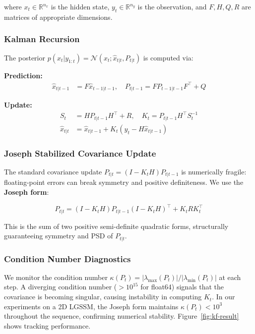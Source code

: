 \documentclass[12pt,a4paper]{article}
\theoremstyle{definition}
\theoremstyle{remark}
\newcommand{\R}{\mathbb{R}}
\newcommand{\N}{\mathcal{N}}
\begin{document}
\noindent where $x_t \in \R^{n_x}$ is the hidden state, $y_t \in \R^{n_y}$ is the observation, and $F, H, Q, R$ are matrices of appropriate dimensions.

\subsubsection{Kalman Recursion}

The posterior $p(x_t | y_{1:t}) = \N(x_t; \hat{x}_{t|t}, P_{t|t})$ is computed via:

\textbf{Prediction:}
\begin{align}
	\hat{x}_{t|t-1} &= F \hat{x}_{t-1|t-1}, \quad
	P_{t|t-1} = F P_{t-1|t-1} F^\top + Q
\end{align}

\textbf{Update:}
\begin{align}
	S_t &= H P_{t|t-1} H^\top + R, \quad
	K_t = P_{t|t-1} H^\top S_t^{-1} \\
	\hat{x}_{t|t} &= \hat{x}_{t|t-1} + K_t (y_t - H \hat{x}_{t|t-1})
\end{align}

\subsubsection{Joseph Stabilized Covariance Update}

The standard covariance update $P_{t|t} = (I - K_t H) P_{t|t-1}$ is numerically fragile: floating-point errors can break symmetry and positive definiteness. We use the \textbf{Joseph form}:

\begin{tcolorbox}[colback=blue!5!white,colframe=blue!75!black,title=Joseph Stabilized Update]
	\begin{equation}
		P_{t|t} = (I - K_t H) P_{t|t-1} (I - K_t H)^\top + K_t R K_t^\top
	\end{equation}
\end{tcolorbox}

\noindent This is the sum of two positive semi-definite quadratic forms, structurally guaranteeing symmetry and PSD of $P_{t|t}$.

\subsubsection{Condition Number Diagnostics}

We monitor the condition number $\kappa(P_t) = |\lambda_{\max}(P_t)| / |\lambda_{\min}(P_t)|$ at each step. A diverging condition number ($> 10^{15}$ for float64) signals that the covariance is becoming singular, causing instability in computing $K_t$. In our experiments on a 2D LGSSM, the Joseph form maintains $\kappa(P_t) < 10^3$ throughout the sequence, confirming numerical stability. Figure~\ref{fig:kf-result} shows tracking performance.
\end{document}
